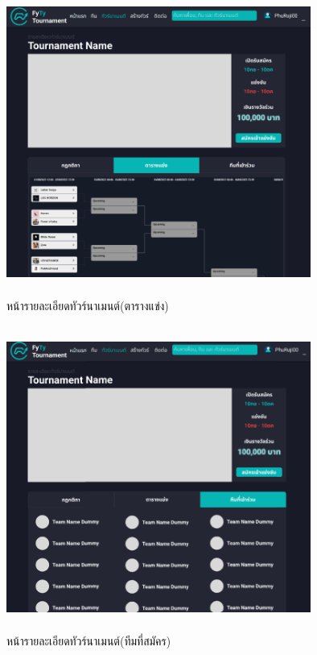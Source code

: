 \begin{figure}[h]
  \begin{center}
  \includegraphics[width=10cm,height=10cm,keepaspectratio]{tourBac.png}
  \end{center}
  \caption[หน้ารายละเอียดทัวร์นาเมนต์(ตารางแข่ง)]{หน้ารายละเอียดทัวร์นาเมนต์(ตารางแข่ง)}
  \label{fig:หน้ารายละเอียดทัวร์นาเมนต์(ตารางแข่ง)}
\end{figure}

\begin{figure}[h]
  \begin{center}
  \includegraphics[width=10cm,height=10cm,keepaspectratio]{TourTeam.png}
  \end{center}
  \caption[หน้ารายละเอียดทัวร์นาเมนต์(ทีมที่สมัคร)]{หน้ารายละเอียดทัวร์นาเมนต์(ทีมที่สมัคร)}
  \label{fig:หน้ารายละเอียดทัวร์นาเมนต์(ทีมที่สมัคร)}
\end{figure}
